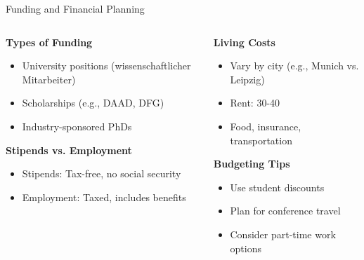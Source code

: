 \documentclass[aspectratio=169,10pt]{beamer}
\begin{document}
\begin{frame}{Funding and Financial Planning}
    \begin{columns}[T]
        \begin{column}{0.5\textwidth}
            \textbf{Types of Funding}
            \begin{itemize}
                \item University positions (wissenschaftlicher Mitarbeiter)
                \item Scholarships (e.g., DAAD, DFG)
                \item Industry-sponsored PhDs
            \end{itemize}
            
            \textbf{Stipends vs. Employment}
            \begin{itemize}
                \item Stipends: Tax-free, no social security
                \item Employment: Taxed, includes benefits
            \end{itemize}
        \end{column}
        \begin{column}{0.5\textwidth}
            \textbf{Living Costs}
            \begin{itemize}
                \item Vary by city (e.g., Munich vs. Leipzig)
                \item Rent: 30-40%
                \item Food, insurance, transportation
            \end{itemize}
            
            \textbf{Budgeting Tips}
            \begin{itemize}
                \item Use student discounts
                \item Plan for conference travel
                \item Consider part-time work options
            \end{itemize}
        \end{column}
    \end{columns}
\end{frame}
\end{document}
